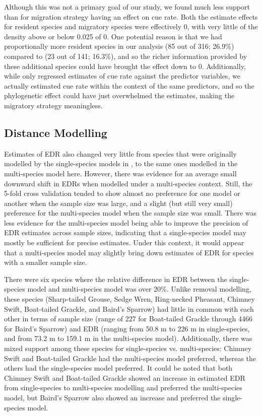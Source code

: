 \documentclass[12pt]{article}
\begin{document}
\par Although this was not a primary goal of our study, we found much less support than \citet{solymos_phylogeny_2018} for migration strategy having an effect on cue rate.
Both the estimate effects for resident species and migratory species were effectively 0, with very little of the density above or below 0.025 of 0.
One potential reason is that we had proportionally more resident species in our analysis (85 out of 316; 26.9\%) compared to \citet{solymos_phylogeny_2018} (23 out of 141; 16.3\%), and so the richer information provided by these additional species could have brought the effect down to 0.
Additionally, while \citet{solymos_phylogeny_2018} only regressed estimates of cue rate against the predictor variables, we actually estimated cue rate within the context of the same predictors, and so the phylogenetic effect could have just overwhelmed the estimates, making the migratory strategy meaningless.

\subsection{Distance Modelling}
\par Estimates of EDR also changed very little from species that were originally modelled by the single-species models in \citet{edwards_point_2023}, to the same ones modelled in the multi-species model here.
However, there was evidence for an average small downward shift in EDRs when modelled under a multi-species context.
Still, the 5-fold cross validation tended to show almost no preference for one model or another when the sample size was large, and a slight (but still very small) preference for the multi-species model when the sample size was small.
There was less evidence for the multi-species model being able to improve the precision of EDR estimates across sample sizes, indicating that a single-species model may mostly be sufficient for precise estimates.
Under this context, it would appear that a multi-species model may slightly bring down estimates of EDR for species with a smaller sample size.

\par There were six species where the relative difference in EDR between the single-species model and multi-species model was over 20\%. Unlike removal modelling, these species (Sharp-tailed Grouse, Sedge Wren, Ring-necked Pheasant, Chimney Swift, Boat-tailed Grackle, and Baird's Sparrow) had little in common with each other in terms of sample size (range of 227 for Boat-tailed Grackle through 4466 for Baird's Sparrow) and EDR (ranging from 50.8 m to 226 m in single-species, and from 73.2 m to 159.1 m in the multi-species model). 
Additionally, there was mixed support among these species for single-species vs. multi-species: Chimney Swift and Boat-tailed Grackle had the multi-species model preferred, whereas the others had the single-species model preferred.
It could be noted that both Chimney Swift and Boat-tailed Grackle showed an increase in estimated EDR from single-species to multi-species modelling and preferred the multi-species model, but Baird's Sparrow also showed an increase and preferred the single-species model.
\end{document}
